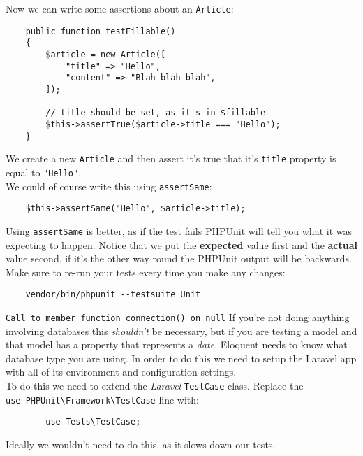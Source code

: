 Now we can write some assertions about an \texttt{Article}:

\begin{verbatim}
    public function testFillable()
    {
        $article = new Article([
            "title" => "Hello",
            "content" => "Blah blah blah",
        ]);

        // title should be set, as it's in $fillable
        $this->assertTrue($article->title === "Hello");
    }
\end{verbatim}

We create a new \texttt{Article} and then assert it's true that it's \texttt{title} property is equal to \texttt{"Hello"}.
\\


We could of course write this using \texttt{assertSame}:

\begin{verbatim}
    $this->assertSame("Hello", $article->title);
\end{verbatim}

Using \texttt{assertSame} is better, as if the test fails PHPUnit will tell you what it was expecting to happen. Notice that we put the \textbf{expected} value first and the \textbf{actual} value second, if it's the other way round the PHPUnit output will be backwards.
\\

Make sure to re-run your tests every time you make any changes:

\begin{verbatim}
    vendor/bin/phpunit --testsuite Unit
\end{verbatim}


\pagebreak


\begin{infobox}{\texttt{Call to member function connection() on null}}
    If you're not doing anything involving databases this \textit{shouldn't} be necessary, but if you are testing a model and that model has a property that represents a \textit{date}, Eloquent needs to know what database type you are using. In order to do this we need to setup the Laravel app with all of its environment and configuration settings.
    \\

    To do this we need to extend the \textit{Laravel} \texttt{TestCase} class. Replace the \\ \texttt{use PHPUnit\textbackslash{}Framework\textbackslash{}TestCase} line with:

    \begin{verbatim}
        use Tests\TestCase;
    \end{verbatim}

    Ideally we wouldn't need to do this, as it slows down our tests.
\end{infobox}


